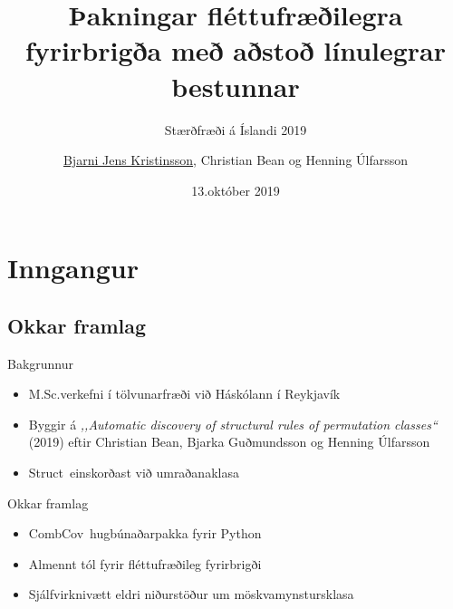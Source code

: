 \documentclass[icelandic]{beamer}
\title[Fléttufræðilegar þakningar]{Þakningar fléttufræðilegra fyrirbrigða með aðstoð línulegrar bestunnar}
\subtitle{Stærðfræði á Íslandi 2019}
\author[Bjarni Jens, Christian og Henning]{\underline{Bjarni Jens Kristinsson}, Christian Bean og Henning Úlfarsson}
\institute{Háskólinn í Reykjavík}
\date{13.\@ október 2019}
\newcommand{\Struct}{\textsf{Struct}}
\newcommand{\CombCov}{\textsf{CombCov}}
\begin{document}
\begin{frame}\titlepage\end{frame}
\begin{frame}\tableofcontents\end{frame}


\section{Inngangur}
\subsection{Okkar framlag}
\begin{frame}{Bakgrunnur}
  \begin{itemize}
    \item M.Sc.\@ verkefni í tölvunarfræði við Háskólann í Reykjavík
    \item Byggir á \emph{,,Automatic discovery of structural rules of permutation classes``} (2019) eftir Christian Bean, Bjarka Guðmundsson og Henning Úlfarsson
    \item \Struct\ einskorðast við umraðanaklasa
  \end{itemize}
\end{frame}

\begin{frame}{Okkar framlag}
\begin{itemize}
  \item \CombCov\ hugbúnaðarpakka fyrir Python
  \item Almennt tól fyrir fléttufræðileg fyrirbrigði
  \item Sjálfvirknivætt eldri niðurstöður um möskvamynstursklasa
\end{itemize}
\end{frame}


\end{document}
